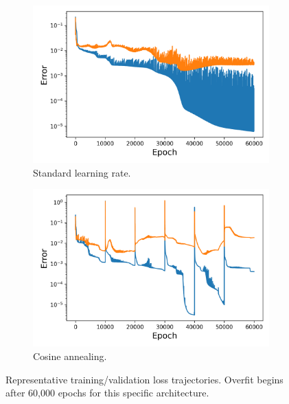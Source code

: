 \begin{figure}[H]
	\centering
	\begin{subfigure}{.45\textwidth}
		\centering
		\includegraphics[width=1\linewidth]{./figs/sm_rep_loss_plot.png}  
		\caption{Standard learning rate.}
	\end{subfigure}
	\begin{subfigure}{.45\textwidth}
		\centering
		\includegraphics[width=1\linewidth]{./figs/snap_rep_loss_plot.png}  
		\caption{Cosine annealing.}
	\end{subfigure}
	\caption{Representative training/validation loss trajectories. Overfit begins after 60,000 epochs for this specific architecture.}
\end{figure}

